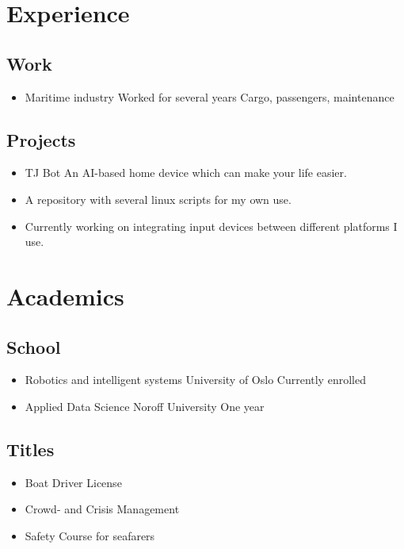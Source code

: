 \documentclass{curriculum}
\begin{document}
	\section{Experience}	
	\begin{half}
	\subsection{Work}
		\begin{itemize}
		\item Maritime industry
			\subitem Worked for several years
			\subitem Cargo, passengers, maintenance
		\end{itemize}
	\end{half}
	\begin{half}
	\subsection{Projects}
		\begin{itemize}
			\item TJ Bot
				\subitem An AI-based home device which can make your life easier.
			\item A repository with several linux scripts for my own use.
			\item Currently working on integrating input devices between different platforms I use.
		\end{itemize}
	\end{half}
	\section{Academics}
	\begin{half}
	\subsection{School}
		\begin{itemize}
			\item Robotics and intelligent systems
				\subitem University of Oslo
				\subitem Currently enrolled
			\item Applied Data Science
				\subitem Noroff University
				\subitem One year
		\end{itemize}
	\end{half}
	\begin{half}
	\subsection{Titles}
		\begin{itemize}
			\item Boat Driver License
			\item Crowd- and Crisis Management
			\item Safety Course for seafarers
		\end{itemize}
	\end{half}
\end{document}
